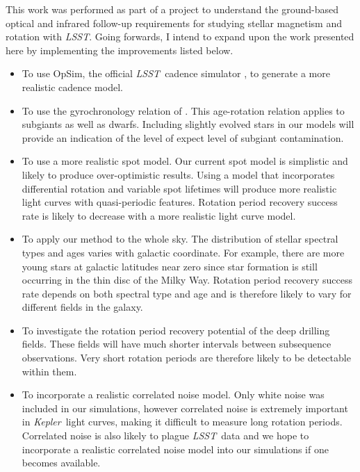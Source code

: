 \documentclass[useAMS, usenatbib, preprint, 12pt]{aastex}
\newcommand{\kepler}{{\it Kepler}}
\newcommand{\LSST}{{\it LSST}}
\begin{document}
This work was performed as part of a project to understand the ground-based
optical and infrared follow-up requirements for studying stellar magnetism and
rotation with \LSST.
Going forwards, I intend to expand upon the work presented here by
implementing the improvements listed below.
\begin{itemize}
\item{To use OpSim, the official \LSST\ cadence simulator \citep{Ridgway2012},
to generate a more realistic cadence model.}
\item{To use the gyrochronology relation of \citet{Vansaders2013}.
This age-rotation relation applies to subgiants as well as dwarfs.
Including slightly evolved stars in our models will provide an indication of
the level of expect level of subgiant contamination.}
\item{To use a more realistic spot model.
Our current spot model is simplistic and likely to produce over-optimistic
results.
Using a model that incorporates differential rotation and variable spot
lifetimes will produce more realistic light curves with quasi-periodic
features.
Rotation period recovery success rate is likely to decrease with a more
realistic light curve model.
}
\item{To apply our method to the whole sky.
The distribution of stellar spectral types and ages varies with galactic
coordinate.
For example, there are more young stars at galactic latitudes near zero since
star formation is still occurring in the thin disc of the Milky Way.
Rotation period recovery success rate depends on both spectral type and
age and is therefore likely to vary for different fields in the galaxy.}
\item{To investigate the rotation period recovery potential of
the deep drilling fields.
These fields will have much shorter intervals between subsequence
observations.
Very short rotation periods are therefore likely to be detectable within
them.}
\item{To incorporate a realistic correlated noise model.
Only white noise was included in our simulations, however correlated noise is
extremely important in \kepler\ light curves, making it difficult to measure
long rotation periods.
Correlated noise is also likely to plague \LSST\ data and we hope to
incorporate a realistic correlated noise model into our simulations if one
becomes available.}
\end{itemize}



\end{document}
